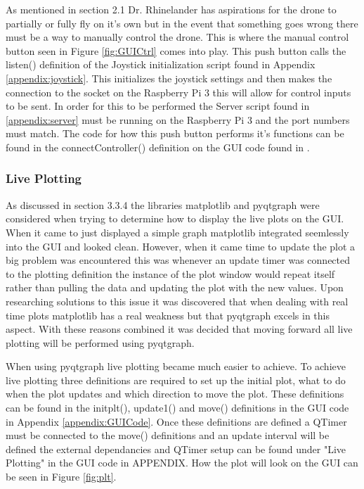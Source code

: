 As mentioned in section 2.1 Dr. Rhinelander has aspirations for the drone to partially or fully fly on it's own but in the event that something goes wrong there must be a way to manually control the drone. This is where the manual control button seen in Figure \ref{fig:GUICtrl} comes into play. This push button calls the listen() definition of the Joystick initialization script found in Appendix \ref{appendix:joystick}. This initializes the joystick settings and then makes the connection to the socket on the Raspberry Pi 3 this will allow for control inputs to be sent. In order for this to be performed the Server script found in \ref{appendix:server}  must be running on the Raspberry Pi 3 and the port numbers must match. The code for how this push button performs it's functions can be found in the connectController() definition on the GUI code found in .

\subsubsection{Live Plotting}
As discussed in section 3.3.4 the libraries matplotlib and pyqtgraph were considered when trying to determine how to display the live plots on the GUI. When it came to just displayed a simple graph matplotlib integrated seemlessly into the GUI and looked clean. However, when it came time to update the plot a big problem was encountered this was whenever an update timer was connected to the plotting definition the instance of the plot window would repeat itself rather than pulling the data and updating the plot with the new values. Upon researching solutions to this issue it was discovered that when dealing with real time plots matplotlib has a real weakness but that pyqtgraph excels in this aspect. With these reasons combined it was decided that moving forward all live plotting will be performed using pyqtgraph.

When using pyqtgraph live plotting became much easier to achieve. To achieve live plotting three definitions are required to set up the initial plot, what to do when the plot updates and which direction to move the plot. These definitions can be found in the initplt(), update1() and move() definitions in the GUI code in Appendix \ref{appendix:GUICode}. Once these definitions are defined a QTimer must be connected to the move() definitions and an update interval will be defined the external dependancies and QTimer setup can be found under "Live Plotting" in the GUI code in APPENDIX. How the plot will look on the GUI can be seen in Figure \ref{fig:plt}.

